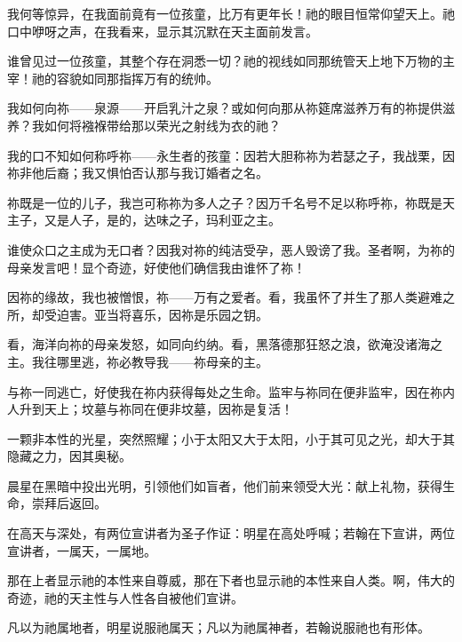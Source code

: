 我何等惊异，在我面前竟有一位孩童，比万有更年长！祂的眼目恒常仰望天上。祂口中咿呀之声，在我看来，显示其沉默在天主面前发言。\par

谁曾见过一位孩童，其整个存在洞悉一切？祂的视线如同那统管天上地下万物的主宰！祂的容貌如同那指挥万有的统帅。\par

我如何向祢——泉源——开启乳汁之泉？或如何向那从祢筵席滋养万有的祢提供滋养？我如何将襁褓带给那以荣光之射线为衣的祂？\par

我的口不知如何称呼祢——永生者的孩童：因若大胆称祢为若瑟之子，我战栗，因祢非他后裔；我又惧怕否认那与我订婚者之名。\par

祢既是一位的儿子，我岂可称祢为多人之子？因万千名号不足以称呼祢，祢既是天主子，又是人子，是的，达味之子，玛利亚之主。\par

谁使众口之主成为无口者？因我对祢的纯洁受孕，恶人毁谤了我。圣者啊，为祢的母亲发言吧！显个奇迹，好使他们确信我由谁怀了祢！\par

因祢的缘故，我也被憎恨，祢——万有之爱者。看，我虽怀了并生了那人类避难之所，却受迫害。亚当将喜乐，因祢是乐园之钥。\par

看，海洋向祢的母亲发怒，如同向约纳。看，黑落德那狂怒之浪，欲淹没诸海之主。我往哪里逃，祢必教导我——祢母亲的主。\par

与祢一同逃亡，好使我在祢内获得每处之生命。监牢与祢同在便非监牢，因在祢内人升到天上；坟墓与祢同在便非坟墓，因祢是复活！\par

一颗非本性的光星，突然照耀；小于太阳又大于太阳，小于其可见之光，却大于其隐藏之力，因其奥秘。\par

晨星在黑暗中投出光明，引领他们如盲者，他们前来领受大光：献上礼物，获得生命，崇拜后返回。\par

在高天与深处，有两位宣讲者为圣子作证：明星在高处呼喊；若翰在下宣讲，两位宣讲者，一属天，一属地。\par

那在上者显示祂的本性来自尊威，那在下者也显示祂的本性来自人类。啊，伟大的奇迹，祂的天主性与人性各自被他们宣讲。\par

凡以为祂属地者，明星说服祂属天；凡以为祂属神者，若翰说服祂也有形体。\par

